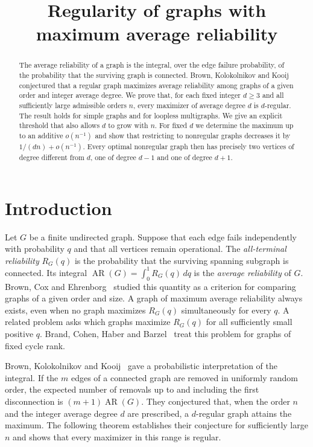 \documentclass[11pt,reqno]{amsart}
\title[Maximum average reliability]{Regularity of graphs with maximum average reliability}
\date{}
\theoremstyle{remark}
\numberwithin{equation}{section}
\newcommand{\AR}{\operatorname{AR}}
\begin{document}
\begin{abstract}
The average reliability of a graph is the integral, over the edge failure probability, of the probability that the surviving graph is connected. Brown, Kolokolnikov and Kooij conjectured that a regular graph maximizes average reliability among graphs of a given order and integer average degree. We prove that, for each fixed integer $d\ge3$ and all sufficiently large admissible orders $n$, every maximizer of average degree $d$ is $d$-regular. The result holds for simple graphs and for loopless multigraphs. We give an explicit threshold that also allows $d$ to grow with $n$. For fixed $d$ we determine the maximum up to an additive $o(n^{-1})$ and show that restricting to nonregular graphs decreases it by $1/(dn)+o(n^{-1})$. Every optimal nonregular graph then has precisely two vertices of degree different from $d$, one of degree $d-1$ and one of degree $d+1$.
\end{abstract}
\maketitle

\section{Introduction}\label{sec:intro}
Let $G$ be a finite undirected graph. Suppose that each edge fails independently with probability $q$ and that all vertices remain operational. The \emph{all-terminal reliability} $R_G(q)$ is the probability that the surviving spanning subgraph is connected. Its integral $\AR(G)=\int_0^1 R_G(q)\,dq$ is the \emph{average reliability} of $G$. Brown, Cox and Ehrenborg~\cite{BCE} studied this quantity as a criterion for comparing graphs of a given order and size. A graph of maximum average reliability always exists, even when no graph maximizes $R_G(q)$ simultaneously for every $q$. A related problem asks which graphs maximize $R_G(q)$ for all sufficiently small positive $q$. Brand, Cohen, Haber and Barzel~\cite{BCHB} treat this problem for graphs of fixed cycle rank.

Brown, Kolokolnikov and Kooij~\cite[Theorem~2.1]{BKK} gave a probabilistic interpretation of the integral. If the $m$ edges of a connected graph are removed in uniformly random order, the expected number of removals up to and including the first disconnection is $(m+1)\AR(G)$. They conjectured that, when the order $n$ and the integer average degree $d$ are prescribed, a $d$-regular graph attains the maximum. The following theorem establishes their conjecture for sufficiently large $n$ and shows that every maximizer in this range is regular.
\end{document}
